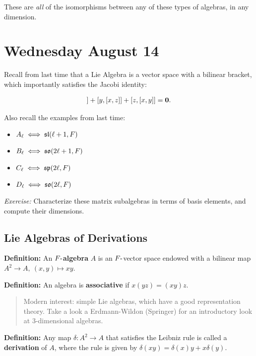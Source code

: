 
These are \emph{all} of the isomorphisms between any of these types of
algebras, in any dimension. 

\hypertarget{wednesday-august-14}{%
\section{Wednesday August 14}\label{wednesday-august-14}}

Recall from last time that a Lie Algebra is a vector space with a
bilinear bracket, which importantly satisfies the Jacobi identity:

\begin{align*}
[x, [y, z]] + [y, [x,z]] + [z, [x, y]] = \vector 0
.\end{align*}

Also recall the examples from last time:

\begin{itemize}
\tightlist
\item
  \(A_\ell \iff {\mathfrak{sl}}(\ell + 1, F)\)
\item
  \(B_\ell \iff {\mathfrak{so}}(2\ell + 1, F)\)
\item
  \(C_\ell \iff {\mathfrak{sp}}(2\ell, F)\)
\item
  \(D_\ell \iff {\mathfrak{so}}(2\ell, F)\)
\end{itemize}

\emph{Exercise:} Characterize these matrix subalgebras in terms of basis
elements, and compute their dimensions.

\hypertarget{lie-algebras-of-derivations}{%
\subsection{Lie Algebras of
Derivations}\label{lie-algebras-of-derivations}}

\textbf{Definition:} An \textbf{\(F{\hbox{-}}\)algebra} \(A\) is an
\(F{\hbox{-}}\)vector space endowed with a bilinear map
\(A^2 \to A,~ (x,y) \mapsto xy\).

\textbf{Definition:} An algebra is \textbf{associative} if
\(x(yz) = (xy)z\).

\begin{quote}
Modern interest: simple Lie algebras, which have a good representation
theory. Take a look a Erdmann-Wildon (Springer) for an introductory look
at 3-dimensional algebras.
\end{quote}

\textbf{Definition:} Any map \(\delta: A^2 \to A\) that satisfies the
Leibniz rule is called a \textbf{derivation} of \(A\), where the rule is
given by \(\delta(xy) = \delta(x)y + x\delta(y)\).

